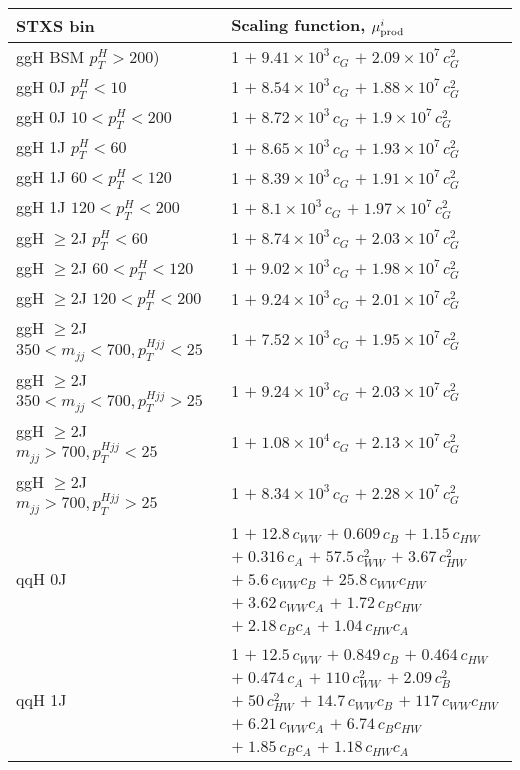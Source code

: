 \begin{tabular}{l|p{}}
    \hline
    STXS bin & Scaling function, $\mu^i_{\rm{prod}}$ \\ \hline
    ggH BSM $p_{T}^{H} > 200$) & 1 $+\;9.41\times 10^{3}\,c_{G}$ $+\;2.09\times 10^{7}\,c_{G}^{2}$ \\
    ggH 0J $p_{T}^{H} < 10$ & 1 $+\;8.54\times 10^{3}\,c_{G}$ $+\;1.88\times 10^{7}\,c_{G}^{2}$ \\
    ggH 0J $10 < p_{T}^{H} < 200$ & 1 $+\;8.72\times 10^{3}\,c_{G}$ $+\;1.9\times 10^{7}\,c_{G}^{2}$ \\
    ggH 1J $p_{T}^{H} < 60$ & 1 $+\;8.65\times 10^{3}\,c_{G}$ $+\;1.93\times 10^{7}\,c_{G}^{2}$ \\
    ggH 1J $60 < p_{T}^{H} < 120$ & 1 $+\;8.39\times 10^{3}\,c_{G}$ $+\;1.91\times 10^{7}\,c_{G}^{2}$ \\
    ggH 1J $120 < p_{T}^{H} < 200$ & 1 $+\;8.1\times 10^{3}\,c_{G}$ $+\;1.97\times 10^{7}\,c_{G}^{2}$ \\
    ggH $\geq$2J $p_{T}^{H} < 60$ & 1 $+\;8.74\times 10^{3}\,c_{G}$ $+\;2.03\times 10^{7}\,c_{G}^{2}$ \\
    ggH $\geq$2J $60 < p_{T}^{H} < 120$ & 1 $+\;9.02\times 10^{3}\,c_{G}$ $+\;1.98\times 10^{7}\,c_{G}^{2}$ \\
    ggH $\geq$2J $120 < p_{T}^{H} < 200$ & 1 $+\;9.24\times 10^{3}\,c_{G}$ $+\;2.01\times 10^{7}\,c_{G}^{2}$ \\
    ggH $\geq$2J $350 < m_{jj} < 700, p_{T}^{Hjj} < 25$ & 1 $+\;7.52\times 10^{3}\,c_{G}$ $+\;1.95\times 10^{7}\,c_{G}^{2}$ \\
    ggH $\geq$2J $350 < m_{jj} < 700, p_{T}^{Hjj} > 25$ & 1 $+\;9.24\times 10^{3}\,c_{G}$ $+\;2.03\times 10^{7}\,c_{G}^{2}$ \\
    ggH $\geq$2J $m_{jj} > 700, p_{T}^{Hjj} < 25$ & 1 $+\;1.08\times 10^{4}\,c_{G}$ $+\;2.13\times 10^{7}\,c_{G}^{2}$ \\
    ggH $\geq$2J $m_{jj} > 700, p_{T}^{Hjj} > 25$ & 1 $+\;8.34\times 10^{3}\,c_{G}$ $+\;2.28\times 10^{7}\,c_{G}^{2}$ \\
    \hline
    qqH 0J & 1 $+\;12.8\,c_{WW}$ $+\;0.609\,c_{B}$ $+\;1.15\,c_{HW}$ $+\;0.316\,c_{A}$ $+\;57.5\,c_{WW}^{2}$ $+\;3.67\,c_{HW}^{2}$ $+\;5.6\,c_{WW}c_{B}$ $+\;25.8\,c_{WW}c_{HW}$ $+\;3.62\,c_{WW}c_{A}$ $+\;1.72\,c_{B}c_{HW}$ $+\;2.18\,c_{B}c_{A}$ $+\;1.04\,c_{HW}c_{A}$ \\
    qqH 1J & 1 $+\;12.5\,c_{WW}$ $+\;0.849\,c_{B}$ $+\;0.464\,c_{HW}$ $+\;0.474\,c_{A}$ $+\;110\,c_{WW}^{2}$ $+\;2.09\,c_{B}^{2}$ $+\;50\,c_{HW}^{2}$ $+\;14.7\,c_{WW}c_{B}$ $+\;117\,c_{WW}c_{HW}$ $+\;6.21\,c_{WW}c_{A}$ $+\;6.74\,c_{B}c_{HW}$ $+\;1.85\,c_{B}c_{A}$ $+\;1.18\,c_{HW}c_{A}$ \\

\end{tabular}
